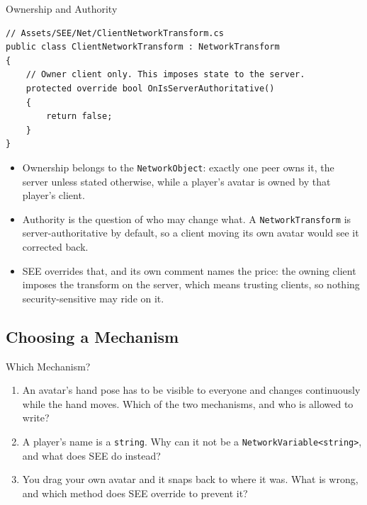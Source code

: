\begin{frame}[fragile]{Ownership and Authority}
  \begin{lstlisting}[basicstyle=\scriptsize\ttfamily]
// Assets/SEE/Net/ClientNetworkTransform.cs
public class ClientNetworkTransform : NetworkTransform
{
    // Owner client only. This imposes state to the server.
    protected override bool OnIsServerAuthoritative()
    {
        return false;
    }
}
  \end{lstlisting}
  \vspace{0.5ex}

  \begin{itemize}
    \item Ownership belongs to the \texttt{NetworkObject}: exactly one peer owns
      it, the server unless stated otherwise, while a player's avatar is owned
      by that player's client.
    \item Authority is the question of who may change what. A
      \texttt{NetworkTransform} is server-authoritative by default, so a client
      moving its own avatar would see it corrected back.
    \item SEE overrides that, and its own comment names the price: the owning
      client imposes the transform on the server, which means trusting clients,
      so nothing security-sensitive may ride on it.
  \end{itemize}
\end{frame}

\subsection{Choosing a Mechanism}

\begin{exerciseframe}{Which Mechanism?}
  \begin{enumerate}
    \item An avatar's hand pose has to be visible to everyone and changes
      continuously while the hand moves. Which of the two mechanisms, and who
      is allowed to write?
    \item A player's name is a \texttt{string}. Why can it not be a
      \texttt{NetworkVariable<string>}, and what does SEE do instead?
    \item You drag your own avatar and it snaps back to where it was. What is
      wrong, and which method does SEE override to prevent it?
  \end{enumerate}
\end{exerciseframe}

